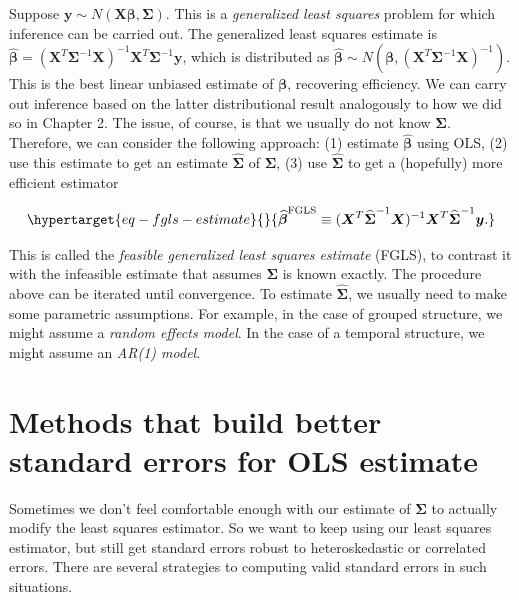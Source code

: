 \documentclass[
  11pt,
  letterpaper,
  oneside]{book}
\theoremstyle{definition}
\theoremstyle{plain}
\theoremstyle{plain}
\theoremstyle{plain}
\theoremstyle{remark}
\begin{document}
Suppose
\(\boldsymbol{y} \sim N(\boldsymbol{X} \boldsymbol{\beta}, \boldsymbol{\Sigma})\).
This is a \emph{generalized least squares} problem for which inference
can be carried out. The generalized least squares estimate is
\(\boldsymbol{\widehat{\beta}} = (\boldsymbol{X}^T \boldsymbol{\Sigma}^{-1}\boldsymbol{X})^{-1}\boldsymbol{X}^T \boldsymbol{\Sigma}^{-1}\boldsymbol{y}\),
which is distributed as
\(\boldsymbol{\widehat{\beta}} \sim N(\boldsymbol{\beta}, (\boldsymbol{X}^T \boldsymbol{\Sigma}^{-1}\boldsymbol{X})^{-1})\).
This is the best linear unbiased estimate of \(\boldsymbol{\beta}\),
recovering efficiency. We can carry out inference based on the latter
distributional result analogously to how we did so in Chapter 2. The
issue, of course, is that we usually do not know
\(\boldsymbol{\Sigma}\). Therefore, we can consider the following
approach: (1) estimate \(\boldsymbol{\widehat{\beta}}\) using OLS, (2)
use this estimate to get an estimate \(\boldsymbol{\widehat{\Sigma}}\)
of \(\boldsymbol{\Sigma}\), (3) use \(\boldsymbol{\widehat{\Sigma}}\) to
get a (hopefully) more efficient estimator

\begin{equation}\protect\hypertarget{eq-fgls-estimate}{}{
\boldsymbol{\widehat{\beta}}^{\text{FGLS}} \equiv (\boldsymbol{X}^T \boldsymbol{\widehat{\Sigma}}^{-1}\boldsymbol{X})^{-1}\boldsymbol{X}^T \boldsymbol{\widehat{\Sigma}}^{-1}\boldsymbol{y}.
}\label{eq-fgls-estimate}\end{equation}

This is called the \emph{feasible generalized least squares estimate}
(FGLS), to contrast it with the infeasible estimate that assumes
\(\boldsymbol{\Sigma}\) is known exactly. The procedure above can be
iterated until convergence. To estimate
\(\boldsymbol{\widehat{\Sigma}}\), we usually need to make some
parametric assumptions. For example, in the case of grouped structure,
we might assume a \emph{random effects model}. In the case of a temporal
structure, we might assume an \emph{AR(1) model}.

\hypertarget{sec-better-standard-errors}{%
\section{Methods that build better standard errors for OLS
estimate}\label{sec-better-standard-errors}}

Sometimes we don't feel comfortable enough with our estimate of
\(\boldsymbol{\Sigma}\) to actually modify the least squares estimator.
So we want to keep using our least squares estimator, but still get
standard errors robust to heteroskedastic or correlated errors. There
are several strategies to computing valid standard errors in such
situations.
\end{document}
